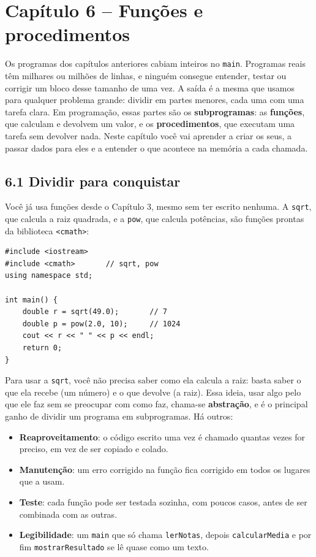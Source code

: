 \section{Capítulo 6 -- Funções e procedimentos}

Os programas dos capítulos anteriores cabiam inteiros no \texttt{main}. Programas reais têm milhares ou milhões de linhas, e ninguém consegue entender, testar ou corrigir um bloco desse tamanho de uma vez. A saída é a mesma que usamos para qualquer problema grande: dividir em partes menores, cada uma com uma tarefa clara. Em programação, essas partes são os \textbf{subprogramas}: as \textbf{funções}, que calculam e devolvem um valor, e os \textbf{procedimentos}, que executam uma tarefa sem devolver nada. Neste capítulo você vai aprender a criar os seus, a passar dados para eles e a entender o que acontece na memória a cada chamada.

\subsection{6.1 Dividir para conquistar}

Você já usa funções desde o Capítulo 3, mesmo sem ter escrito nenhuma. A \texttt{sqrt}, que calcula a raiz quadrada, e a \texttt{pow}, que calcula potências, são funções prontas da biblioteca \texttt{<cmath>}:

\begin{codigo}
\begin{Verbatim}[breaklines=true, breaksymbolleft={}, fontsize=\footnotesize]
#include <iostream>
#include <cmath>       // sqrt, pow
using namespace std;

int main() {
    double r = sqrt(49.0);       // 7
    double p = pow(2.0, 10);     // 1024
    cout << r << " " << p << endl;
    return 0;
}
\end{Verbatim}
\end{codigo}

Para usar a \texttt{sqrt}, você não precisa saber como ela calcula a raiz: basta saber o que ela recebe (um número) e o que devolve (a raiz). Essa ideia, usar algo pelo que ele faz sem se preocupar com como faz, chama-se \textbf{abstração}, e é o principal ganho de dividir um programa em subprogramas. Há outros:

\begin{itemize}
  \item \textbf{Reaproveitamento}: o código escrito uma vez é chamado quantas vezes for preciso, em vez de ser copiado e colado.
  \item \textbf{Manutenção}: um erro corrigido na função fica corrigido em todos os lugares que a usam.
  \item \textbf{Teste}: cada função pode ser testada sozinha, com poucos casos, antes de ser combinada com as outras.
  \item \textbf{Legibilidade}: um \texttt{main} que só chama \texttt{lerNotas}, depois \texttt{calcularMedia} e por fim \texttt{mostrarResultado} se lê quase como um texto.
\end{itemize}

